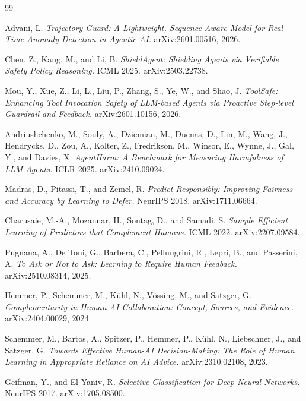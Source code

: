 \documentclass[11pt]{article}
\begin{document}
\begin{thebibliography}{99}

 Advani, L. \emph{Trajectory Guard: A Lightweight, Sequence-Aware Model for
Real-Time Anomaly Detection in Agentic AI.} arXiv:2601.00516, 2026.

 Chen, Z., Kang, M., and Li, B. \emph{ShieldAgent: Shielding Agents via
Verifiable Safety Policy Reasoning.} ICML 2025. arXiv:2503.22738.

 Mou, Y., Xue, Z., Li, L., Liu, P., Zhang, S., Ye, W., and Shao, J. \emph{ToolSafe:
Enhancing Tool Invocation Safety of LLM-based Agents via Proactive Step-level Guardrail and Feedback.}
arXiv:2601.10156, 2026.

 Andriushchenko, M., Souly, A., Dziemian, M., Duenas, D., Lin, M., Wang, J.,
Hendrycks, D., Zou, A., Kolter, Z., Fredrikson, M., Winsor, E., Wynne, J., Gal, Y., and Davies, X.
\emph{AgentHarm: A Benchmark for Measuring Harmfulness of LLM Agents.} ICLR 2025. arXiv:2410.09024.

 Madras, D., Pitassi, T., and Zemel, R. \emph{Predict Responsibly: Improving
Fairness and Accuracy by Learning to Defer.} NeurIPS 2018. arXiv:1711.06664.

 Charusaie, M.-A., Mozannar, H., Sontag, D., and Samadi, S. \emph{Sample
Efficient Learning of Predictors that Complement Humans.} ICML 2022. arXiv:2207.09584.

 Pugnana, A., De Toni, G., Barbera, C., Pellungrini, R., Lepri, B., and Passerini,
A. \emph{To Ask or Not to Ask: Learning to Require Human Feedback.} arXiv:2510.08314, 2025.

 Hemmer, P., Schemmer, M., K\"uhl, N., V\"ossing, M., and Satzger, G.
\emph{Complementarity in Human-AI Collaboration: Concept, Sources, and Evidence.} arXiv:2404.00029,
2024.

 Schemmer, M., Bartos, A., Spitzer, P., Hemmer, P., K\"uhl, N., Liebschner, J.,
and Satzger, G. \emph{Towards Effective Human-AI Decision-Making: The Role of Human Learning in
Appropriate Reliance on AI Advice.} arXiv:2310.02108, 2023.

 Geifman, Y., and El-Yaniv, R. \emph{Selective Classification for Deep Neural
Networks.} NeurIPS 2017. arXiv:1705.08500.


\end{thebibliography}
\end{document}
